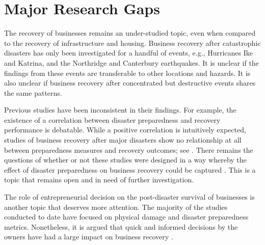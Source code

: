 \section{Major Research Gaps} 
The recovery of businesses remains an under-studied topic, even when compared to the recovery of infrastructure and housing. Business recovery after catastrophic disasters has only been investigated for a handful of events, e.g., Hurricanes Ike and Katrina, and the Northridge and Canterbury earthquakes. It is unclear if the findings from these events are transferable to other locations and hazards. It is also unclear if business recovery after concentrated but destructive events shares the same patterns. \ 

Previous studies have been inconsistent in their findings. For example, the existence of a correlation between disaster preparedness and recovery performance is debatable. While a positive correlation is intuitively expected, studies of business recovery after major disasters show no relationship at all between preparedness measures and recovery outcomes; see \citet{webb2000businesses}. There remains the questions of whether or not these studies were designed in a way whereby the effect of disaster preparedness on business recovery could be captured \citep{xiao2014hazard}. This is a topic that remains open and in need of further investigation.\ 

The role of entrepreneurial decision on the post-disaster survival of businesses is another topic that deserves more attention. The majority of the studies conducted to date have focused on physical damage and disaster preparedness metrics. Nonetheless, it is argued that quick and informed decisions by the owners have had a large impact on business recovery \citep{morrish2020post}.\

